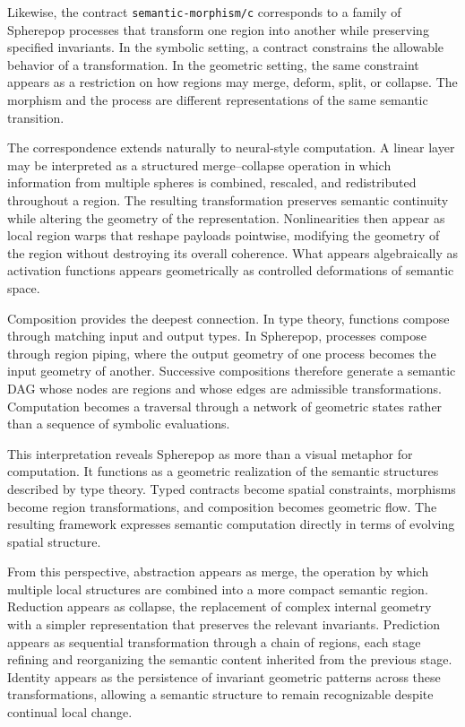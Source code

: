 \documentclass[12pt,letterpaper]{article}
\theoremstyle{remark}
\begin{document}
Likewise, the contract \verb|semantic-morphism/c| corresponds to a family of Spherepop processes that transform one region into another while preserving specified invariants. In the symbolic setting, a contract constrains the allowable behavior of a transformation. In the geometric setting, the same constraint appears as a restriction on how regions may merge, deform, split, or collapse. The morphism and the process are different representations of the same semantic transition.

The correspondence extends naturally to neural-style computation. A linear layer may be interpreted as a structured merge--collapse operation in which information from multiple spheres is combined, rescaled, and redistributed throughout a region. The resulting transformation preserves semantic continuity while altering the geometry of the representation. Nonlinearities then appear as local region warps that reshape payloads pointwise, modifying the geometry of the region without destroying its overall coherence. What appears algebraically as activation functions appears geometrically as controlled deformations of semantic space.

Composition provides the deepest connection. In type theory, functions compose through matching input and output types. In Spherepop, processes compose through region piping, where the output geometry of one process becomes the input geometry of another. Successive compositions therefore generate a semantic DAG whose nodes are regions and whose edges are admissible transformations. Computation becomes a traversal through a network of geometric states rather than a sequence of symbolic evaluations.

This interpretation reveals Spherepop as more than a visual metaphor for computation. It functions as a geometric realization of the semantic structures described by type theory. Typed contracts become spatial constraints, morphisms become region transformations, and composition becomes geometric flow. The resulting framework expresses semantic computation directly in terms of evolving spatial structure.

From this perspective, abstraction appears as merge, the operation by which multiple local structures are combined into a more compact semantic region. Reduction appears as collapse, the replacement of complex internal geometry with a simpler representation that preserves the relevant invariants. Prediction appears as sequential transformation through a chain of regions, each stage refining and reorganizing the semantic content inherited from the previous stage. Identity appears as the persistence of invariant geometric patterns across these transformations, allowing a semantic structure to remain recognizable despite continual local change.
\end{document}
